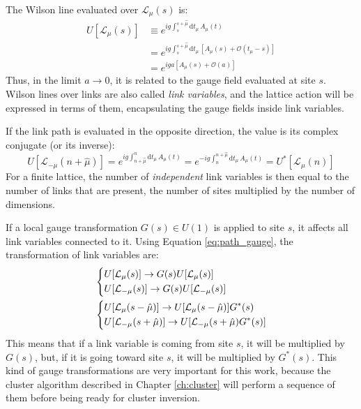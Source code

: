 The Wilson line evaluated over $\mathcal L_\mu(s)$ is:
\begin{equation}\label{eq:link}
    \begin{aligned}
        U[\mathcal L_{\mu}(s)] &\equiv e^{ig\int_s^{s+\hat\mu}\mathrm dt_\mu\,A_\mu(t)} \\
                       &= e^{ig\int_s^{s+\hat\mu}\mathrm dt_\mu\,\left[A_\mu(s) + \mathcal O\left(t_\mu-s\right)\right]} \\
                       &= e^{iga\left[A_\mu(s) + \mathcal O\left(a\right)\right]}
    \end{aligned}
\end{equation}
Thus, in the limit $a \to 0$, it is related to the gauge field evaluated at site $s$.
Wilson lines over links are also called \emph{link variables}, and the lattice action will be expressed in terms of them,
encapsulating the gauge fields inside link variables.

If the link path is evaluated in the opposite direction, the value is its complex conjugate (or its inverse):
\[
    U[\mathcal L_{-\mu}(n+\hat\mu)] = e^{ig\int^n_{n+\hat\mu}\mathrm dt_\mu\,A_\mu(t)}
                                        = e^{-ig\int_n^{n+\hat\mu}\mathrm dt_\mu\,A_\mu(t)} = U^*[\mathcal L_{\mu}(n)]
\]
For a finite lattice, the number of \emph{independent} link variables is then equal to the number of links that are present,
\ie the number of sites multiplied by the number of dimensions.

If a local gauge transformation $G(s) \in U(1)$ is applied to site $s$, it affects all link variables connected to it.
Using Equation \eqref{eq:path_gauge}, the transformation of link variables are:
\begin{equation}\label{eq:site_gauge}
    \begin{aligned}
        &\begin{dcases}
            U[\mathcal L_\mu(s)] \rightarrow G(s)U[\mathcal L_\mu(s)] \\
            U[\mathcal L_{-\mu}(s)] \rightarrow G(s)U[\mathcal L_{-\mu}(s)]
        \end{dcases} \\
        &\begin{dcases}
            U[\mathcal L_\mu(s-\hat\mu)] \rightarrow U[\mathcal L_\mu(s-\hat\mu)]G^*(s) \\
            U[\mathcal L_{-\mu}(s+\hat\mu)] \rightarrow U[\mathcal L_{-\mu}(s+\hat\mu)G^*(s)]
        \end{dcases}
    \end{aligned}
\end{equation}
This means that if a link variable is coming from site $s$, it will be multiplied by $G(s)$, but,
if it is going toward site $s$, it will be multiplied by $G^*(s)$.
This kind of gauge transformations are very important for this work, because the cluster algorithm described in Chapter \ref{ch:cluster}
will perform a sequence of them before being ready for cluster inversion.

